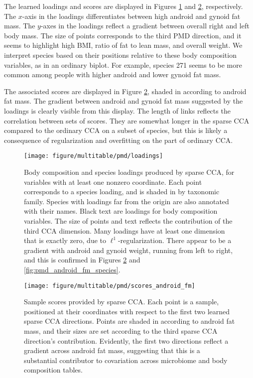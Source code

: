 \documentclass[utf8]{frontiersFPHY} %
\begin{document}
The learned loadings and scores are displayed in Figures \ref{fig:pmd_loadings}
and \ref{fig:pmd_scores_android_fm}, respectively. The $x$-axis in the loadings
differentiates between high android and gynoid fat mass. The $y$-axes in the
loadings reflect a gradient between overall right and left body mass. The size
of points corresponds to the third PMD direction, and it seems to highlight high
BMI, ratio of fat to lean mass, and overall weight. We interpret species based
on their positions relative to these body composition variables, as in an
ordinary biplot. For example, species 271 seems to be more common among people
with higher android and lower gynoid fat mass.

The associated scores are displayed in Figure \ref{fig:pmd_scores_android_fm},
shaded in according to android fat mass. The gradient between android and gynoid
fat mass suggested by the loadings is clearly visible from this display. The
length of links reflects the correlation between sets of scores. They are
somewhat longer in the sparse CCA compared to the ordinary CCA on a subset of
species, but this is likely a consequence of regularization and overfitting on
the part of ordinary CCA.

\begin{figure}
  \centering \texttt{[image: figure/multitable/pmd/loadings]}
  \caption{ Body composition and species loadings produced by sparse CCA, for
    variables with at least one nonzero coordinate. Each point corresponds to a
    species loading, and is shaded in by taxonomic family. Species with loadings
    far from the origin are also annotated with their names. Black text are
    loadings for body composition variables. The size of points and text
    reflects the contribution of the third CCA dimension. Many loadings have at
    least one dimension that is exactly zero, due to $\ell^{1}$-regularization.
    There appear to be a gradient with android and gynoid weight, running from
    left to right, and this is confirmed in Figures
    \ref{fig:pmd_scores_android_fm} and \ref{fig:pmd_android_fm_species}.
    \label{fig:pmd_loadings}
  }
\end{figure}

\begin{figure}
  \centering
  \texttt{[image: figure/multitable/pmd/scores\_android\_fm]}
  \caption{ Sample scores provided by sparse CCA. Each point is a sample,
    positioned at their coordinates with respect to the first two learned sparse
    CCA directions. Points are shaded in according to android fat mass, and
    their sizes are set according to the third sparse CCA direction's
    contribution. Evidently, the first two directions reflect a gradient across
    android fat mass, suggesting that this is a substantial contributor to
    covariation across microbiome and body composition tables.
    \label{fig:pmd_scores_android_fm}
  }
\end{figure}
\end{document}
